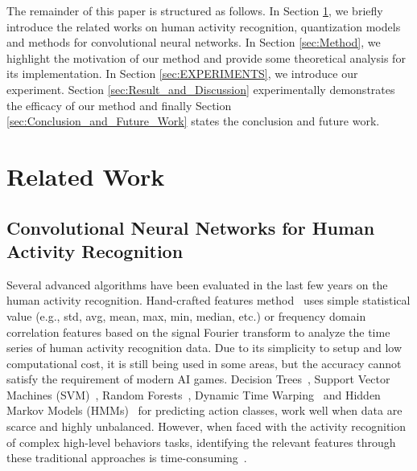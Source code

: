 \documentclass[twoside,twocolumn]{article}
\begin{document}
The remainder of this paper is structured as follows. In Section \ref{sec:Related_Work}, we briefly introduce the related works on human activity recognition, quantization models and methods for convolutional neural networks. In Section \ref{sec:Method}, we highlight the motivation of our method and provide some theoretical analysis for its implementation. In Section \ref{sec:EXPERIMENTS}, we introduce our experiment. Section \ref{sec:Result_and_Discussion} experimentally demonstrates the efficacy of our method and finally Section \ref{sec:Conclusion_and_Future_Work} states the conclusion and future work.

\section{Related Work}\label{sec:Related_Work}

\subsection{Convolutional Neural Networks for Human Activity Recognition}
Several advanced algorithms have been evaluated in the last few years on the human activity recognition. Hand-crafted features method~\cite{b20} uses simple statistical value (e.g., std, avg, mean, max, min, median, etc.) or frequency domain correlation features based on the signal Fourier transform to analyze the time series of human activity recognition data. Due to its simplicity to setup and low computational cost, it is still being used in some areas, but the accuracy cannot satisfy the requirement of modern AI games. Decision Trees~\cite{b21}, Support Vector Machines (SVM)~\cite{b22}, Random Forests~\cite{b19}, Dynamic Time Warping~\cite{b23} and Hidden Markov Models (HMMs)~\cite{b24,b25} for predicting action classes, work well when data are scarce and highly unbalanced. However, when faced with the activity recognition of complex high-level behaviors tasks, identifying the relevant features through these traditional approaches is time-consuming~\cite{b22}.
\end{document}
